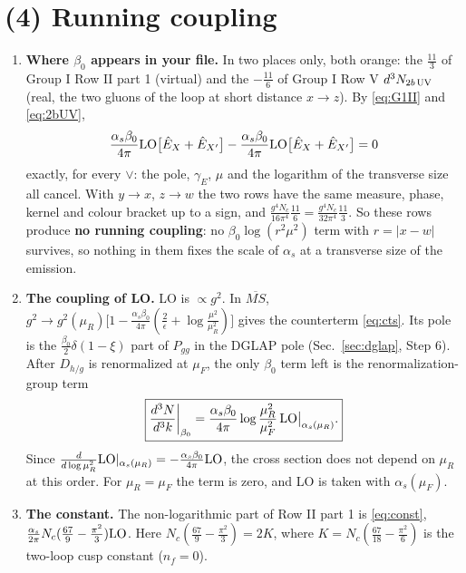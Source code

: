 \documentclass[10pt]{article}
\numberwithin{equation}{section}
\newcommand{\LO}{{\rm LO}}
\begin{document}
\section{(4) Running coupling}\label{sec:rc}
\begin{enumerate}
\item \textbf{Where $\beta_0$ appears in your file.} In two places only, both orange: the $\frac{11}{3}$ of Group I Row II part 1 (virtual) and the $-\frac{11}{6}$ of Group I Row V $d^3N_{2b\,\rm UV}$ (real, the two gluons of the loop at short distance $x\to z$). By \eqref{eq:G1II} and \eqref{eq:2bUV},
\begin{equation}
\frac{\alpha_s\beta_0}{4\pi}\LO\big[\hat E_X+\hat E_{X'}\big]-\frac{\alpha_s\beta_0}{4\pi}\LO\big[\hat E_X+\hat E_{X'}\big]=0
\end{equation}
exactly, for every $\vee$: the pole, $\gamma_E$, $\mu$ and the logarithm of the transverse size all cancel. With $y\to x$, $z\to w$ the two rows have the same measure, phase, kernel and colour bracket up to a sign, and $\frac{g^4N_c}{16\pi^4}\frac{11}{6}=\frac{g^4N_c}{32\pi^4}\frac{11}{3}$. So these rows produce \textbf{no running coupling}: no $\beta_0\log(r^2\mu^2)$ term with $r=|x-w|$ survives, so nothing in them fixes the scale of $\alpha_s$ at a transverse size of the emission.
\item \textbf{The coupling of LO.} LO is $\propto g^2$. In $\overline{MS}$, $g^2\to g^2(\mu_R)\big[1-\frac{\alpha_s\beta_0}{4\pi}(\frac2\epsilon+\log\frac{\mu^2}{\mu_R^2})\big]$ gives the counterterm \eqref{eq:cts}. Its pole is the $\frac{\beta_0}{2}\delta(1-\xi)$ part of $P_{gg}$ in the DGLAP pole (Sec.~\ref{sec:dglap}, Step 6). After $D_{h/g}$ is renormalized at $\mu_F$, the only $\beta_0$ term left is the renormalization-group term
\begin{equation}
\boxed{\frac{d^3N}{d^3k}\bigg|_{\beta_0}=\frac{\alpha_s\beta_0}{4\pi}\log\frac{\mu_R^2}{\mu_F^2}\,\LO\big|_{\alpha_s(\mu_R)}.}
\end{equation}
Since $\frac{d}{d\log\mu_R^2}\LO|_{\alpha_s(\mu_R)}=-\frac{\alpha_s\beta_0}{4\pi}\LO$, the cross section does not depend on $\mu_R$ at this order. For $\mu_R=\mu_F$ the term is zero, and LO is taken with $\alpha_s(\mu_F)$.
\item \textbf{The constant.} The non-logarithmic part of Row II part 1 is \eqref{eq:const}, $\frac{\alpha_s}{2\pi}N_c(\frac{67}{9}-\frac{\pi^2}{3})\LO$. Here $N_c(\frac{67}{9}-\frac{\pi^2}{3})=2K$, where $K=N_c(\frac{67}{18}-\frac{\pi^2}{6})$ is the two-loop cusp constant ($n_f=0$).

\end{enumerate}
\end{document}
